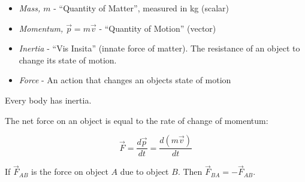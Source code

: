 \setcounter{lecture}{2}
\begin{definition}
\begin{itemize}

\item \emph{Mass, $m$} - ``Quantity of Matter'', measured in kg (scalar)

\item \emph{Momentum, $\vec{p} = m\vec{v}$} - ``Quantity of Motion'' (vector)

\item \emph{Inertia} - ``Vis Insita'' (innate force of matter). The resistance of an object to change its state of motion.

\item \emph{Force} - An action that changes an objects state of motion
\end{itemize}
\end{definition}

\begin{theorem}
Every body has inertia. 	
\end{theorem}


\begin{theorem}
The net force on an object is equal to the rate of change of momentum:

\[ \vec{F} = \frac{d\vec{p}}{dt} = \frac{d(m\vec{v})}{dt}\]
\end{theorem}

\begin{theorem}
If $\vec{F}_{AB}$ is the force on object $A$ due to object $B$. Then $\vec{F}_{BA} = -\vec{F}_{AB}$.
\end{theorem}

